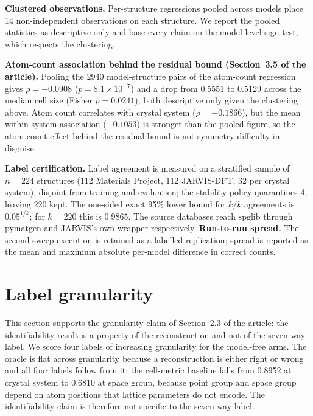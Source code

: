 \textbf{Clustered observations.} Per-structure regressions pooled across models place 14 non-independent
observations on each structure. We report the pooled statistics as descriptive only and base every claim on
the model-level sign test, which respects the clustering.

\textbf{Atom-count association behind the residual bound (Section~3.5 of the article).} Pooling the 2940
model-structure pairs of the atom-count regression gives $\rho=-0.0908$ ($p=8.1\times10^{-7}$) and a drop
from 0.5551 to 0.5129 across the median cell size (Fisher $p=0.0241$), both descriptive only given the
clustering above. Atom count correlates with crystal system ($\rho=-0.1866$), but the mean within-system
association ($-0.1053$) is stronger than the pooled figure, so the atom-count effect behind the residual
bound is not symmetry difficulty in disguise.

\textbf{Label certification.} Label agreement is measured on a stratified sample of $n=224$ structures (112
Materials Project, 112 JARVIS-DFT, 32 per crystal system), disjoint from training and evaluation; the
stability policy quarantines 4, leaving 220 kept. The one-sided exact 95\% lower bound for $k/k$ agreements is
$0.05^{1/k}$; for $k = 220$ this is $0.9865$. The source databases reach spglib through pymatgen and JARVIS's
own wrapper respectively.
\textbf{Run-to-run spread.} The second sweep execution is retained as a labelled replication; spread is
reported as the mean and maximum absolute per-model difference in correct counts.

\section{Label granularity}
\label{app:granularity}
This section supports the granularity claim of Section~2.3 of the article: the identifiability result is a
property of the reconstruction and not of the seven-way label. We score four labels of increasing granularity
for the model-free arms. The oracle is flat across granularity because a
reconstruction is either right or wrong and all four labels follow from it; the cell-metric baseline falls
from 0.8952 at crystal system to 0.6810 at space group, because point group and space group depend on atom
positions that lattice parameters do not encode. The identifiability claim is therefore not specific to the
seven-way label.
